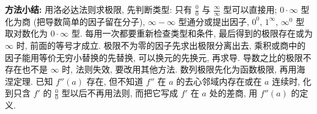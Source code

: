 \documentclass[UTF8,openany]{ctexbook}
\theoremstyle{chinesetextbook}
\begin{document}
\par\indent\textbf{方法小结:} 用洛必达法则求极限, 先判断类型: 只有 $\displaystyle\frac00$ 与 $\displaystyle\frac\infty\infty$ 型可以直接用; $0\cdot\infty$ 型化为商 (把导数简单的因子留在分子), $\infty-\infty$ 型通分或提出因子, $0^0$, $1^\infty$, $\infty^0$ 型取对数化为 $0\cdot\infty$ 型. 每用一次都要重新检查类型和条件, 最后得到的极限存在或为 $\infty$ 时, 前面的等号才成立. 极限不为零的因子先求出极限分离出去, 乘积或商中的因子能用等价无穷小替换的先替换, 可以换元的先换元, 再求导. 导数之比的极限不存在也不是 $\infty$ 时, 法则失效, 要改用其他方法. 数列极限先化为函数极限, 再用海涅定理. 已知 $f''(a)$ 存在, 但不知道 $f''$ 在 $a$ 的去心邻域内存在或在 $a$ 连续时, 化到只含 $f'$ 的 $\displaystyle\frac00$ 型以后不再用法则, 而把它写成 $f'$ 在 $a$ 处的差商, 用 $f''(a)$ 的定义.
\end{document}
